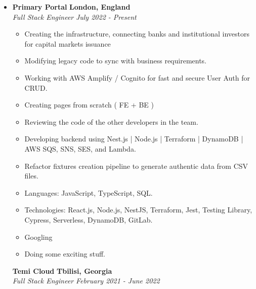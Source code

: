 \documentclass[10pt,letterpaper]{article}
\begin{document}
  \begin{itemize}
    \item[]

    {\textbf{Primary Portal} \hfill
    \textbf{London, England}}
  \\
  {\emph{Full Stack Engineer} \hfill \emph{July 2022 - Present}}

  \begin{itemize}[label=\textbullet]
  \itemsep0.5em
   \item Creating the infrastructure, connecting banks and institutional investors for capital markets issuance
  \item Modifying legacy code to sync with business requirements.
  \item Working with AWS Amplify / Cognito for fast and secure User Auth for CRUD.
  \item Creating pages from scratch ( FE + BE )
  \item Reviewing the code of the other developers in the team.
  \item Developing backend using Nest.js | Node.js | Terraform | DynamoDB | AWS SQS, SNS, SES, and Lambda.
  \item Refactor fixtures creation pipeline to generate authentic data from CSV files.
  \item Languages: JavaScript, TypeScript, SQL.
  \item Technologies: React.js, Node.js, NestJS, Terraform, Jest, Testing Library, Cypress, Serverless, DynamoDB, GitLab.
  \item Googling
  \item Doing some exciting stuff.
  \end{itemize}


   {\textbf{Temi Cloud} \hfill
      \textbf{Tbilisi, Georgia}}
    \\
    {\emph{Full Stack Engineer} \hfill \emph{February 2021 - June 2022}}


\end{itemize}
\end{document}

